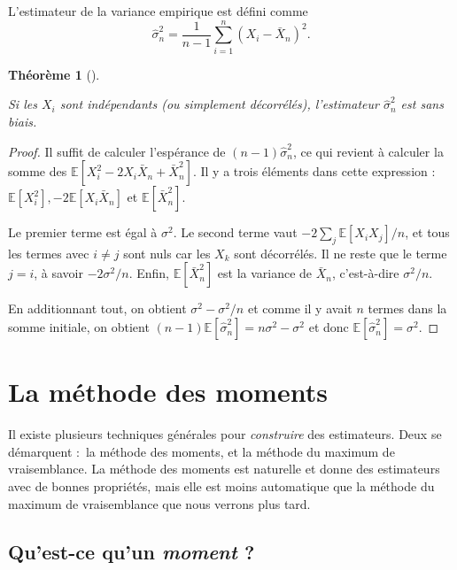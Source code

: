 \documentclass[
  10,
  letterpaper,
  DIV=11,
  numbers=noendperiod]{scrreport}
\theoremstyle{plain}
\newtheorem{theorem}{Théorème}[chapter]
\theoremstyle{definition}
\theoremstyle{plain}
\theoremstyle{definition}
\theoremstyle{definition}
\theoremstyle{plain}
\theoremstyle{remark}
\begin{document}
L'estimateur de la variance empirique est défini comme
\[\hat{\sigma}_n^2 = \frac{1}{n-1}\sum_{i=1}^n(X_i - \bar{X}_n)^2.\]

\begin{theorem}[]\protect\hypertarget{thm-unb}{}\label{thm-unb}

Si les \(X_i\) sont indépendants (ou simplement décorrélés),
l'estimateur \(\hat{\sigma}_n^2\) est sans biais.

\end{theorem}

\begin{proof}

Il suffit de calculer l'espérance de \((n-1)\hat{\sigma}^2_n\), ce qui
revient à calculer la somme des
\(\mathbb{E}[X_i^2 - 2X_i \bar{X}_n + \bar{X}_n^2]\). Il y a trois
éléments dans cette expression
:~\(\mathbb{E}[X_i^2], -2\mathbb{E}[X_i \bar{X}_n]\) et
\(\mathbb{E}[\bar{X}_n^2]\).

Le premier terme est égal à \(\sigma^2\). Le second terme vaut
\(-2\sum_j \mathbb{E}[X_i X_j]/n\), et tous les termes avec \(i\neq j\)
sont nuls car les \(X_k\) sont décorrélés. Il ne reste que le terme
\(j=i\), à savoir \(-2 \sigma^2 / n\). Enfin,
\(\mathbb{E}[\bar{X}_n^2]\) est la variance de \(\bar{X}_n\),
c'est-à-dire \(\sigma^2/n\).

En additionnant tout, on obtient \(\sigma^2 - \sigma^2 / n\) et comme il
y avait \(n\) termes dans la somme initiale, on obtient
\((n-1)\mathbb{E}[\hat{\sigma}_n^2] = n\sigma^2 - \sigma^2\) et donc
\(\mathbb{E}[\hat{\sigma}_n^2] = \sigma^2\).

\end{proof}


\hypertarget{la-muxe9thode-des-moments}{%
\chapter{La méthode des moments}\label{la-muxe9thode-des-moments}}

Il existe plusieurs techniques générales pour \emph{construire} des
estimateurs. Deux se démarquent :~la méthode des moments, et la méthode
du maximum de vraisemblance. La méthode des moments est naturelle et
donne des estimateurs avec de bonnes propriétés, mais elle est moins
automatique que la méthode du maximum de vraisemblance que nous verrons
plus tard.

\hypertarget{quest-ce-quun-moment}{%
\section{\texorpdfstring{Qu'est-ce qu'un \emph{moment}
?}{Qu'est-ce qu'un moment ?}}\label{quest-ce-quun-moment}}
\end{document}
